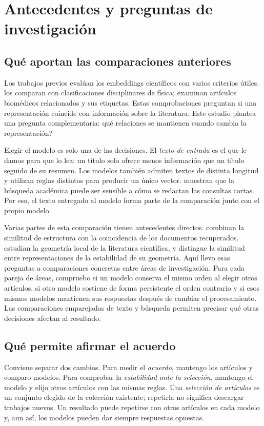 \documentclass[12pt]{article}
\begin{document}
\section{Antecedentes y preguntas de investigación}
\subsection{Qué aportan las comparaciones anteriores}
Los trabajos previos evalúan los embeddings científicos con varios criterios útiles. \citet{refc0e2cc29e0} los comparan con clasificaciones disciplinares de física; \citet{refbe130e2973} examinan artículos biomédicos relacionados y sus etiquetas. Estas comprobaciones preguntan si una representación coincide con información sobre la literatura. Este estudio plantea una pregunta complementaria: \textquestiondown{}qué relaciones se mantienen cuando cambia la representación?

Elegir el modelo es solo una de las decisiones. El \emph{texto de entrada} es el que le damos para que lo lea: un título solo ofrece menos información que un título seguido de su resumen. Los modelos también admiten textos de distinta longitud y utilizan reglas distintas para producir un único vector. \citet{singh-singh-2022-inefficiency} muestran que la búsqueda académica puede ser sensible a cómo se redactan las consultas cortas. Por eso, el texto entregado al modelo forma parte de la comparación junto con el propio modelo.

Varias partes de esta comparación tienen antecedentes directos. \citet{ref4e1e0d5582} combinan la similitud de estructura con la coincidencia de los documentos recuperados. \citet{ref6da178065c} estudian la geometría local de la literatura científica, y \citet{ref483cb38608} distingue la similitud entre representaciones de la estabilidad de su geometría. Aquí llevo esas preguntas a comparaciones concretas entre áreas de investigación. Para cada pareja de áreas, compruebo si un modelo conserva el mismo orden al elegir otros artículos, si otro modelo sostiene de forma persistente el orden contrario y si esos mismos modelos mantienen sus respuestas después de cambiar el procesamiento. Las comparaciones emparejadas de texto y búsqueda permiten precisar qué otras decisiones afectan al resultado.

\subsection{Qué permite afirmar el acuerdo}
Conviene separar dos cambios. Para medir el \emph{acuerdo}, mantengo los artículos y comparo modelos. Para comprobar la \emph{estabilidad ante la selección}, mantengo el modelo y elijo otros artículos con las mismas reglas. Una \emph{selección de artículos} es un conjunto elegido de la colección existente; repetirla no significa descargar trabajos nuevos. Un resultado puede repetirse con otros artículos en cada modelo y, aun así, los modelos pueden dar siempre respuestas opuestas.
\end{document}
